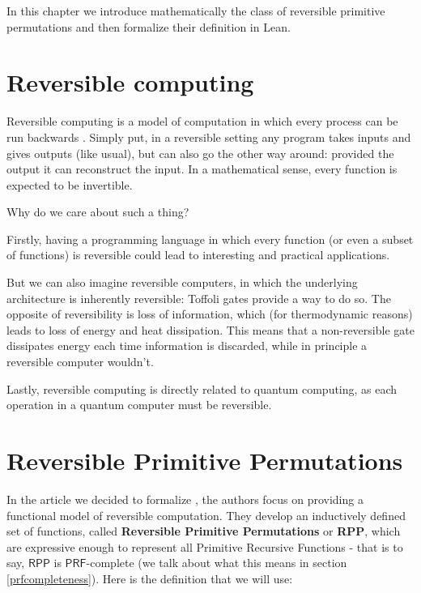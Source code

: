\documentclass{book}
\theoremstyle{definition}
\theoremstyle{remark}
\theoremstyle{plain}
\newcommand{\RPP}{\mathsf{RPP}}
\newcommand{\PRF}{\mathsf{PRF}}
\begin{document}
In this chapter we introduce mathematically the class of reversible primitive permutations
and then formalize their definition in Lean.

\section{Reversible computing}

Reversible computing is a model of computation in which every process can be run backwards \cite{Morita17}\cite{perumalla2013chc}.
Simply put, in a reversible setting any program takes inputs and gives outputs (like usual), but can also go the other way around:
provided the output it can reconstruct the input.
In a mathematical sense, every function is expected to be invertible.

Why do we care about such a thing?

Firstly, having a programming language in which every function (or even a subset of functions) is reversible could lead to interesting and practical applications.

But we can also imagine reversible computers, in which the underlying architecture is inherently reversible:
Toffoli gates provide a way to do so.
The opposite of reversibility is loss of information, which (for thermodynamic reasons) leads to loss of energy and heat dissipation.
This means that a non-reversible gate dissipates energy each time information is discarded, while in principle a reversible computer wouldn't.

Lastly, reversible computing is directly related to quantum computing, as each operation in a quantum computer must be reversible.


\section{Reversible Primitive Permutations}

In the article we decided to formalize \cite{PAOLINI2020218}, the authors focus on providing a functional model of reversible computation.
They develop an inductively defined set of functions, called \textbf{Reversible Primitive Permutations} or \textbf{RPP},
which are expressive enough to represent all Primitive Recursive Functions -
that is to say, $\RPP$ is $\PRF$-complete (we talk about what this means in section \ref{prfcompleteness}).
Here is the definition that we will use:

\newpage
\end{document}

